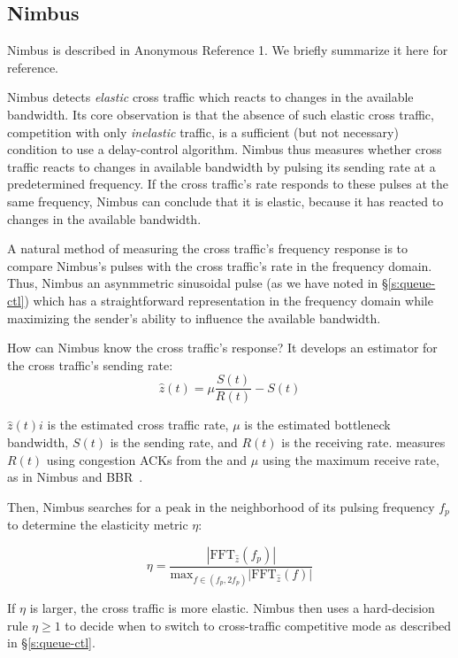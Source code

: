 \begin{Appendix}
\section{Nimbus}\label{s:app:nimbus}

Nimbus is described in Anonymous Reference 1.
We briefly summarize it here for reference.

Nimbus detects \emph{elastic} cross traffic which reacts to changes in the available bandwidth. Its core observation is that the absence of such elastic cross traffic, \ie competition with only \emph{inelastic} traffic, is a sufficient (but not necessary) condition to use a delay-control algorithm.
Nimbus thus measures whether cross traffic reacts to changes in available bandwidth by pulsing its sending rate at a predetermined frequency.
If the cross traffic's rate responds to these pulses at the same frequency, Nimbus can conclude that it is elastic, because it has reacted to changes in the available bandwidth.

A natural method of measuring the cross traffic's frequency response is to compare Nimbus's pulses with the cross traffic's rate in the frequency domain.
Thus, Nimbus an asynmmetric sinusoidal pulse (as we have noted in \S\ref{s:queue-ctl}) which has a straightforward representation in the frequency domain while maximizing the sender's ability to influence the available bandwidth.

How can Nimbus know the cross traffic's response? It develops an estimator for the cross traffic's sending rate:
\begin{equation}
    \hat{z}(t) = \mu\frac{S(t)}{R(t)} - S(t)
\end{equation}

$\hat{z}(t)i$ is the estimated cross traffic rate, $\mu$ is the estimated bottleneck bandwidth, $S(t)$ is the sending rate, and $R(t)$ is the receiving rate. 
\name measures $R(t)$ using congestion ACKs from the \outbox and $\mu$ using the maximum receive rate, as in Nimbus and BBR~\cite{bbr}.

Then, Nimbus searches for a peak in the neighborhood of its pulsing frequency $f_p$ to determine the elasticity metric $\eta$:

\begin{equation}
    \eta = \frac{|\text{FFT}_{\hat{z}}(f_p)|}{\text{max}_{f \in (f_p, 2f_p)} |\text{FFT}_{\hat{z}}(f)|}
\end{equation}

If $\eta$ is larger, the cross traffic is more elastic.
Nimbus then uses a hard-decision rule $\eta \ge 1$ to decide when to switch to cross-traffic competitive mode as described in \S\ref{s:queue-ctl}.

\end{Appendix}
